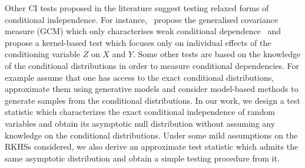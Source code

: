 Other CI tests proposed in the literature suggest testing relaxed forms of conditional independence. For instance,~\citet{gcm2020} propose the generalised covariance measure (GCM) which only characterises weak conditional dependence~\cite{daudin1980partial} and \citet{Zhang2017FeaturetoFeatureRF} propose a kernel-based test which focuses only on individual effects of the conditioning variable $Z$ on $X$ and $Y$. Some other tests are based on the knowledge of the conditional distributions in order to measure conditional dependencies. For example \citet{candes2018panning} assume that one has access to the exact conditional distributions,~\citet{BellotS19,shi2021double} approximate them using generative models and \citet{sen2017modelpowered} consider model-based methods to generate samples from the conditional distributions. In our work, we design a test statistic which characterizes the exact conditional independence of random variables and obtain its asymptotic null distribution without assuming any knowledge on the conditional distributions. Under some mild assumptions on the RKHSs considered, we also derive an approximate test statistic which admits the same asymptotic distribution and obtain a simple testing procedure from it.









